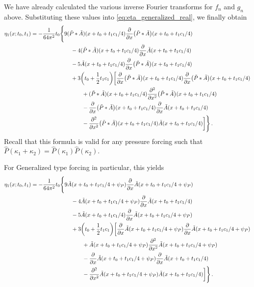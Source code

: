 \documentclass{jfm}
\begin{document}
We have already calculated the various inverse Fourier transforms for
$f_n$ and $g_n$ above.
Substituting these values into \cref{eq:eta_generalized_real}, we
finally obtain
\begin{align*}
  \eta_1(x;t_0,t_1) =
  -\frac{1}{64 \pi^2} t_0 &\Biggl\{
    9 (\tilde{P}*\tilde{A})(x+t_0+t_1 c_1/4) \pdv{x}(\tilde{P}*\tilde{A})(x+t_0+t_1 c_1/4) \\
    &\qquad
    - 4 (\tilde{P}*\tilde{A})(x+t_0+t_1 c_1/4) \pdv{x} \tilde{A}(x+t_0+t_1 c_1/4) \\
    &\qquad
    - 5 \tilde{A}(x+t_0+t_1 c_1/4) \pdv{x} (\tilde{P}*\tilde{A})(x+t_0+t_1 c_1/4) \\
    &\qquad
    + 3 \pqty{t_0+\frac{1}{2} t_1 c_1} \biggl[
    \pdv{x} (\tilde{P}*\tilde{A})(x+t_0+t_1 c_1/4) \pdv{x} (\tilde{P}*\tilde{A})(x+t_0+t_1 c_1/4) \\
    &\qquad\qquad
    +(\tilde{P}*\tilde{A})(x+t_0+t_1 c_1/4) \pdv[2]{x} (\tilde{P}*\tilde{A})(x+t_0+t_1 c_1/4) \\
    &\qquad\qquad
    -\pdv{x} (\tilde{P}*\tilde{A})(x+t_0+t_1 c_1/4) \pdv{x} \tilde{A}(x+t_0+t_1 c_1/4) \\
    &\qquad\qquad
    -\pdv[2]{x} (\tilde{P}*\tilde{A})(x+t_0+t_1 c_1/4) \tilde{A}(x+t_0+t_1 c_1/4)
  \biggr]
  \Biggr\} \,.
\end{align*}
Recall that this formula is valid for any pressure forcing such that
$\hat{P}(\kappa_1+\kappa_2) = \hat{P}(\kappa_1) \hat{P}(\kappa_2)$.

For Generalized type forcing in particular, this yields
\begin{align*}
  \eta_1(x;t_0,t_1) =
  -\frac{1}{64 \pi^2} t_0 &\Biggl\{
    9 \tilde{A}(x+t_0+t_1 c_1/4+\psi_P) \pdv{x}\tilde{A}(x+t_0+t_1 c_1/4+\psi_P) \\
    &\qquad
    - 4 \tilde{A}(x+t_0+t_1 c_1/4+\psi_P) \pdv{x} \tilde{A}(x+t_0+t_1 c_1/4) \\
    &\qquad
    - 5 \tilde{A}(x+t_0+t_1 c_1/4) \pdv{x} \tilde{A}(x+t_0+t_1 c_1/4+\psi_P) \\
    &\qquad
    + 3 \pqty{t_0+\frac{1}{2} t_1 c_1} \biggl[
    \pdv{x} \tilde{A}(x+t_0+t_1 c_1/4+\psi_P) \pdv{x} \tilde{A}(x+t_0+t_1 c_1/4+\psi_P) \\
    &\qquad\qquad
    +\tilde{A}(x+t_0+t_1 c_1/4+\psi_P) \pdv[2]{x} \tilde{A}(x+t_0+t_1 c_1/4+\psi_P) \\
    &\qquad\qquad
    -\pdv{x} \tilde{A}(x+t_0+t_1 c_1/4+\psi_P) \pdv{x} \tilde{A}(x+t_0+t_1 c_1/4) \\
    &\qquad\qquad
    -\pdv[2]{x} \tilde{A}(x+t_0+t_1 c_1/4+\psi_P) \tilde{A}(x+t_0+t_1 c_1/4)
  \biggr]
  \Biggr\} \,.
\end{align*}
\end{document}
